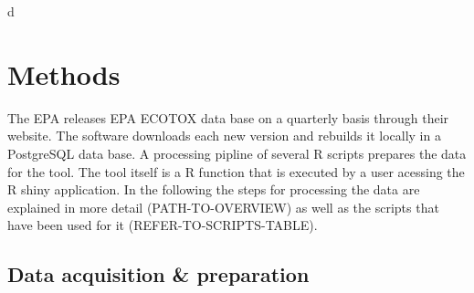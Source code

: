 d\documentclass[english]{article}
\newcommand{\epa}{EPA ECOTOX data base}
\begin{document}
\section*{Methods}


The EPA releases \epa{} on a quarterly basis through their website. The software downloads each new version and rebuilds it locally in a PostgreSQL data base. A processing pipline of several R \cite{r_core_team_r_2017} scripts prepares the data for the tool. The tool itself is a R function that is executed by a user acessing the R shiny \citep{chang_shiny_2018} application. In the following the steps for processing the data are explained in more detail (PATH-TO-OVERVIEW) as well as the scripts that have been used for it (REFER-TO-SCRIPTS-TABLE).

\subsection*{Data acquisition \& preparation}
\end{document}
